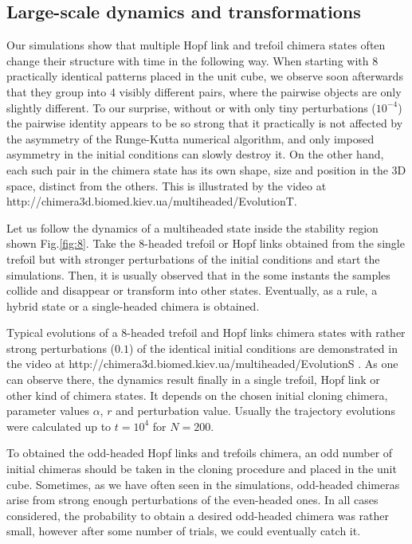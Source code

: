 \documentclass[epjST]{svjour}
\begin{document}
\subsection{Large-scale dynamics and transformations}


\hspace*{0.5cm} Our simulations show that multiple Hopf link and trefoil chimera states often change their structure with time in the following way.  When starting with 8 practically identical patterns placed in the unit cube, we observe soon afterwards  that they group into 4 visibly different  pairs, where the pairwise objects are only slightly different.  To our surprise, without or with only tiny perturbations ($10^{-4}$) the pairwise identity appears to be so strong that it practically is not affected by the asymmetry of the Runge-Kutta numerical algorithm, and  only imposed asymmetry in the initial conditions can slowly destroy it.  On the other hand, each such pair in the chimera state  has its own shape, size and position in the 3D space, distinct from the others.  This is illustrated by the video at http://chimera3d.biomed.kiev.ua/multiheaded/EvolutionT. 

Let us follow the dynamics of a multiheaded state inside the stability region shown Fig.\ref{fig:8}. Take the 8-headed trefoil or Hopf links obtained from the single trefoil but with stronger perturbations of the initial conditions and start the simulations.   Then, it is usually observed that in the some instants the samples collide and disappear or transform into other states.  Eventually, as a rule,  a hybrid state or a single-headed chimera is obtained. 

Typical evolutions of a 8-headed trefoil and Hopf links chimera states with rather strong perturbations ($0.1$) of the identical initial conditions are demonstrated in the video at http://chimera3d.biomed.kiev.ua/multiheaded/EvolutionS . As one can observe there, the dynamics result finally in 
a single trefoil, Hopf link or other kind of chimera states. It depends on the chosen initial cloning chimera, parameter values $\alpha$, $r$  and  perturbation value. Usually the trajectory evolutions were calculated  up to $t= 10^{4}$ for $N=200$.

 
To obtained the odd-headed Hopf links and trefoils chimera, an odd number of initial chimeras should be taken in the cloning procedure and placed in the unit cube. Sometimes, as we have often seen in the simulations, odd-headed chimeras arise from strong enough perturbations of the even-headed ones. In all cases considered, the probability to obtain a desired odd-headed chimera was rather small, however after some number of trials, we could eventually catch it.
\end{document}
